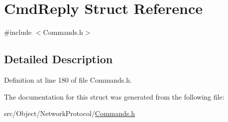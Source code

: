 \hypertarget{struct_cmd_reply}{
\section{CmdReply Struct Reference}
\label{struct_cmd_reply}
}


{\ttfamily \#include $<$Commands.h$>$}



\subsection{Detailed Description}


Definition at line 180 of file Commands.h.



The documentation for this struct was generated from the following file:\begin{DoxyCompactItemize}
\item 
src/Object/NetworkProtocol/\hyperlink{_commands_8h}{Commands.h}\end{DoxyCompactItemize}
